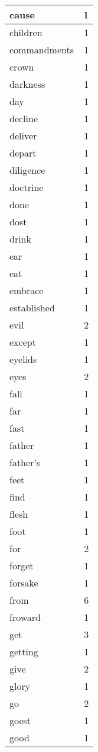 \begin{center}
\begin{longtable}{l|r}
cause & 1\\ \hline 
children & 1\\ \hline 
commandments & 1\\ \hline 
crown & 1\\ \hline 
darkness & 1\\ \hline 
day & 1\\ \hline 
decline & 1\\ \hline 
deliver & 1\\ \hline 
depart & 1\\ \hline 
diligence & 1\\ \hline 
doctrine & 1\\ \hline 
done & 1\\ \hline 
dost & 1\\ \hline 
drink & 1\\ \hline 
ear & 1\\ \hline 
eat & 1\\ \hline 
embrace & 1\\ \hline 
established & 1\\ \hline 
evil & 2\\ \hline 
except & 1\\ \hline 
eyelids & 1\\ \hline 
eyes & 2\\ \hline 
fall & 1\\ \hline 
far & 1\\ \hline 
fast & 1\\ \hline 
father & 1\\ \hline 
father's & 1\\ \hline 
feet & 1\\ \hline 
find & 1\\ \hline 
flesh & 1\\ \hline 
foot & 1\\ \hline 
for & 2\\ \hline 
forget & 1\\ \hline 
forsake & 1\\ \hline 
from & 6\\ \hline 
froward & 1\\ \hline 
get & 3\\ \hline 
getting & 1\\ \hline 
give & 2\\ \hline 
glory & 1\\ \hline 
go & 2\\ \hline 
goest & 1\\ \hline 
good & 1\\ \hline 

\end{longtable}
\end{center}
